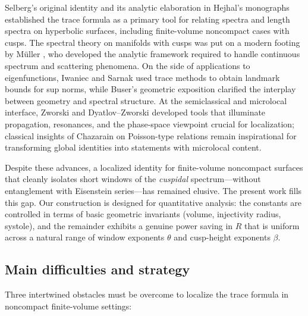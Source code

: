 Selberg’s original identity \cite{selberg1956} and its analytic elaboration in Hejhal’s monographs \cite{hejhal1976,hejhal1983} established the trace formula as a primary tool for relating spectra and length spectra on hyperbolic surfaces, including finite-volume noncompact cases with cusps. The spectral theory on manifolds with cusps was put on a modern footing by M\"uller \cite{mueller1983}, who developed the analytic framework required to handle continuous spectrum and scattering phenomena. On the side of applications to eigenfunctions, Iwaniec and Sarnak \cite{iwaniec1995} used trace methods to obtain landmark bounds for sup norms, while Buser’s geometric exposition \cite{buser1992} clarified the interplay between geometry and spectral structure. At the semiclassical and microlocal interface, Zworski \cite{zworski2012} and Dyatlov--Zworski \cite{dyatlovzworski2019} developed tools that illuminate propagation, resonances, and the phase-space viewpoint crucial for localization; classical insights of Chazarain \cite{chazarain1974} on Poisson-type relations remain inspirational for transforming global identities into statements with microlocal content.

Despite these advances, a localized identity for finite-volume noncompact surfaces that cleanly isolates short windows of the \emph{cuspidal} spectrum—without entanglement with Eisenstein series—has remained elusive. The present work fills this gap. Our construction is designed for quantitative analysis: the constants are controlled in terms of basic geometric invariants (volume, injectivity radius, systole), and the remainder exhibits a genuine power saving in $R$ that is uniform across a natural range of window exponents $\theta$ and cusp-height exponents $\beta$.

\subsection{Main difficulties and strategy}

Three intertwined obstacles must be overcome to localize the trace formula in noncompact finite-volume settings:

